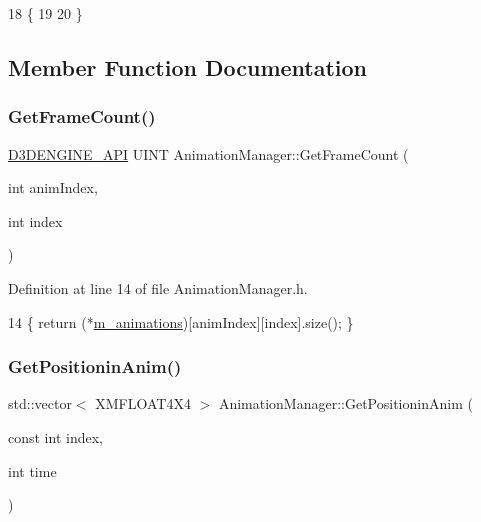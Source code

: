 \begin{DoxyCode}
18                                     \{
19 
20 \}
\end{DoxyCode}


\subsection{Member Function Documentation}
\mbox{\label{class_animation_manager_a200eb95bbc5285bfc9531e482d5f5259}} 
\subsubsection{\texorpdfstring{Get\+Frame\+Count()}{GetFrameCount()}}
{\footnotesize\ttfamily \mbox{\hyperlink{stdafx_8h_a8ee2d990c5dfba7794dd2b60741d7722}{D3\+D\+E\+N\+G\+I\+N\+E\+\_\+\+A\+PI}} U\+I\+NT Animation\+Manager\+::\+Get\+Frame\+Count (\begin{DoxyParamCaption}\item[{int}]{anim\+Index,  }\item[{int}]{index }\end{DoxyParamCaption})\hspace{0.3cm}{\ttfamily [inline]}}



Definition at line 14 of file Animation\+Manager.\+h.


\begin{DoxyCode}
14 \{ \textcolor{keywordflow}{return} (*\mbox{\hyperlink{class_animation_manager_a30d55ef88d1fcea24ba39a254a84b56a}{m\_animations}})[animIndex][index].size(); \}
\end{DoxyCode}
\mbox{\label{class_animation_manager_a7ec02b034f66a7e6b1e4ebdc1db64db3}} 
\subsubsection{\texorpdfstring{Get\+Positionin\+Anim()}{GetPositioninAnim()}}
{\footnotesize\ttfamily std\+::vector$<$ X\+M\+F\+L\+O\+A\+T4\+X4 $>$ Animation\+Manager\+::\+Get\+Positionin\+Anim (\begin{DoxyParamCaption}\item[{const int}]{index,  }\item[{int}]{time }\end{DoxyParamCaption})}



